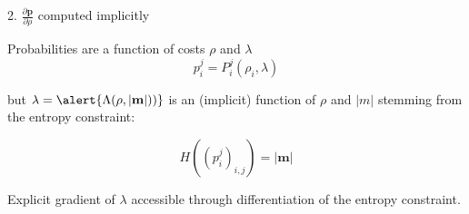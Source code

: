 \documentclass[10pt]{beamer}
\begin{document}
\begin{frame}{2. $\frac{\partial \mathbf{p}}{\partial \rho}$ computed implicitly}

    Probabilities are a function of costs $\rho$ and $\lambda$
    \begin{equation}
        p_i^j = P_i^j\left(\rho_{i}, \lambda\right)%
    \end{equation}
    
    \pause
    
    but $\lambda = \alert{\Lambda(\rho,|\mathbf{m}|))}$ is an (implicit) function of $\rho$ and $|m|$ stemming from the entropy constraint:
    
    \begin{equation}
        H\left(\left(p_i^j\right)_{i,j}\right)=|\mathbf{m}|
    \end{equation}
    
    \pause
    
    Explicit gradient of $\lambda$ accessible through differentiation of the entropy constraint.
    
\end{frame}




    
    
\end{document}
